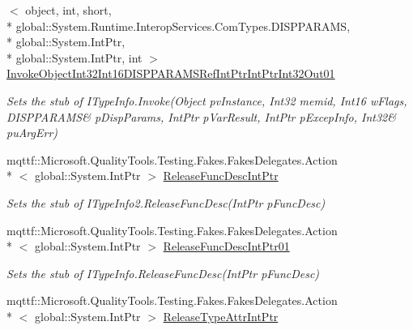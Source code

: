 \begin{DoxyCompactItemize}
$<$ object, int, short, \\*
global\-::\-System.\-Runtime.\-Interop\-Services.\-Com\-Types.\-D\-I\-S\-P\-P\-A\-R\-A\-M\-S, \\*
global\-::\-System.\-Int\-Ptr, \\*
global\-::\-System.\-Int\-Ptr, int $>$ \hyperlink{class_system_1_1_runtime_1_1_interop_services_1_1_com_types_1_1_fakes_1_1_stub_i_type_info2_af267cd272a63d5c0b874b6534d1c0d00}{Invoke\-Object\-Int32\-Int16\-D\-I\-S\-P\-P\-A\-R\-A\-M\-S\-Ref\-Int\-Ptr\-Int\-Ptr\-Int32\-Out01}
\begin{DoxyCompactList}\small\item\em Sets the stub of I\-Type\-Info.\-Invoke(Object pv\-Instance, Int32 memid, Int16 w\-Flags, D\-I\-S\-P\-P\-A\-R\-A\-M\-S\& p\-Disp\-Params, Int\-Ptr p\-Var\-Result, Int\-Ptr p\-Excep\-Info, Int32\& pu\-Arg\-Err)\end{DoxyCompactList}\item 
mqttf\-::\-Microsoft.\-Quality\-Tools.\-Testing.\-Fakes.\-Fakes\-Delegates.\-Action\\*
$<$ global\-::\-System.\-Int\-Ptr $>$ \hyperlink{class_system_1_1_runtime_1_1_interop_services_1_1_com_types_1_1_fakes_1_1_stub_i_type_info2_a81f2629a96b6cc59e4134a90e2364250}{Release\-Func\-Desc\-Int\-Ptr}
\begin{DoxyCompactList}\small\item\em Sets the stub of I\-Type\-Info2.\-Release\-Func\-Desc(\-Int\-Ptr p\-Func\-Desc)\end{DoxyCompactList}\item 
mqttf\-::\-Microsoft.\-Quality\-Tools.\-Testing.\-Fakes.\-Fakes\-Delegates.\-Action\\*
$<$ global\-::\-System.\-Int\-Ptr $>$ \hyperlink{class_system_1_1_runtime_1_1_interop_services_1_1_com_types_1_1_fakes_1_1_stub_i_type_info2_aaf02da172585d6cb952d45d18390ab3e}{Release\-Func\-Desc\-Int\-Ptr01}
\begin{DoxyCompactList}\small\item\em Sets the stub of I\-Type\-Info.\-Release\-Func\-Desc(\-Int\-Ptr p\-Func\-Desc)\end{DoxyCompactList}\item 
mqttf\-::\-Microsoft.\-Quality\-Tools.\-Testing.\-Fakes.\-Fakes\-Delegates.\-Action\\*
$<$ global\-::\-System.\-Int\-Ptr $>$ \hyperlink{class_system_1_1_runtime_1_1_interop_services_1_1_com_types_1_1_fakes_1_1_stub_i_type_info2_a00ee6476cdc0f704d5547093cba750f3}{Release\-Type\-Attr\-Int\-Ptr}

\end{DoxyCompactItemize}
